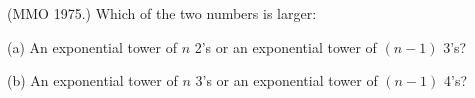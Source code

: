(MMO 1975.) Which of the two numbers is larger:

(a) An exponential tower of $n$ 2's or an exponential tower of $(n - 1)$ 3's?

(b) An exponential tower of $n$ 3's or an exponential tower of $(n - 1)$ 4's?
